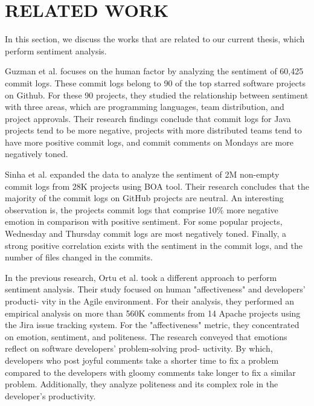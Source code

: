 \chapter{RELATED WORK}

In this section, we discuss the works that are related to our current thesis, which perform sentiment analysis.


Guzman et al. \cite{guzman2014sentiment} focuses on the human factor by analyzing the sentiment of 60,425 commit logs. These commit logs belong to 90 of the top starred software projects on Github. For these 90 projects, they studied the relationship between sentiment with three areas, which are programming languages, team distribution, and project approvals. Their research findings conclude that commit logs for Java projects tend to be more negative, projects with more distributed teams tend to have more positive commit logs, and commit comments on Mondays are more negatively toned.


Sinha et al. \cite{sinha2016analyzing} expanded the data to analyze the sentiment of 2M non-empty commit logs from 28K projects using BOA \cite{dyer2013boa} tool. Their research concludes that the majority of the commit logs on GitHub projects are neutral. An interesting observation is, the projects commit logs that comprise 10\% more negative emotion in comparison with positive sentiment. For some popular projects, Wednesday and Thursday commit logs are most negatively toned. Finally, a strong positive correlation exists with the sentiment in the commit logs, and the number of files changed in the commits.


In the previous research, Ortu et al. \cite{ortu2015bullies} took a different approach to perform sentiment analysis. Their study focused on human "affectiveness" and developers' producti- vity in the Agile environment. For their analysis, they performed an empirical analysis on more than 560K comments from 14 Apache projects using the Jira issue tracking system. For the "affectiveness" metric, they concentrated on emotion, sentiment, and politeness. The research conveyed that emotions reflect on software developers' problem-solving prod- uctivity. By which, developers who post joyful comments take a shorter time to fix a problem compared to the developers with gloomy comments take longer to fix a similar problem. Additionally, they analyze politeness and its complex role in the developer's productivity. 

